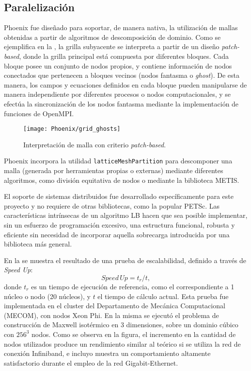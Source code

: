 \subsection{Paralelizaci\'on}

Phoenix fue dise\~nado para soportar, de manera nativa, la utilizaci\'on de mallas obtenidas a partir de algoritmos de descomposici\'on de dominio. Como se ejemplifica en la , la grilla subyacente se interpreta a partir de un dise\~no \emph{patch-based}, donde la grilla principal est\'a compuesta por diferentes bloques. Cada bloque posee un conjunto de nodos propios, y contiene informaci\'on de nodos conectados que pertenecen a bloques vecinos (nodos fantasma o \emph{ghost}). De esta manera, los campos y ecuaciones definidos en cada bloque pueden manipularse de manera independiente por diferentes procesos o nodos computacionales, y se efect\'ua la sincronizaci\'on de los nodos fantasma mediante la implementaci\'on de funciones de OpenMPI. 

\begin{figure}[ht]
	\centering
	\texttt{[image: Phoenix/grid\_ghosts]}
	\caption{Interpretaci\'on de malla con criterio \emph{patch-based}.}
	\label{fig:patch_based}
\end{figure}

Phoenix incorpora la utilidad \texttt{latticeMeshPartition} para descomponer una malla (generada por herramientas propias o externas) mediante diferentes algoritmos, como divisi\'on equitativa de nodos o mediante la biblioteca METIS.

El soporte de sistemas distribuidos fue desarrollado espec\'ificamente para este proyecto y no requiere de otras bibliotecas, como la popular PETSc. Las caracter\'isticas intr\'insecas de un algoritmo LB hacen que sea posible implementar, sin un esfuerzo de programaci\'on excesivo, una estructura funcional, robusta y eficiente sin necesidad de incorporar aquella sobrecarga introducida por una biblioteca m\'as general. 

En la  se muestra el resultado de una prueba de escalabilidad, definido a trav\'es de \emph{Speed Up}:
\begin{equation}
	Speed\,Up = t_r / t,
\end{equation}
donde $t_r$ es un tiempo de ejecuci\'on de referencia, como el correspondiente a 1 n\'ucleo o nodo (20 n\'ucleos), y $t$ el tiempo de c\'alculo actual. Esta prueba fue implementada en el cluster del Departamento de Mec\'anica Computacional (MECOM), con nodos Xeon Phi. En la misma se ejecut\'o el problema de construcci\'on de Maxwell isot\'ermico en 3 dimensiones, sobre un dominio c\'ubico con $256^3$ nodos. Como se observa en la figura, el incremento en la cantidad de nodos utilizados produce un rendimiento similar al te\'orico si se utiliza la red de conexi\'on Infiniband, e incluyo muestra un comportamiento altamente satisfactorio durante el empleo de la red Gigabit-Ethernet.

